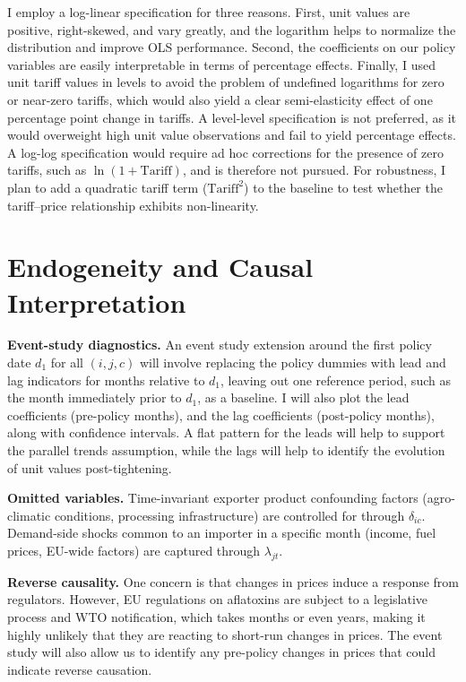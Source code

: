 \documentclass[12pt]{article}
\begin{document}
I employ a log-linear specification for three reasons. First, unit values are positive, right-skewed, and vary greatly, and the logarithm helps to normalize the distribution and improve OLS performance. Second, the coefficients on our policy variables are easily interpretable in terms of percentage effects. Finally, I used unit tariff values in levels to avoid the problem of undefined logarithms for zero or near-zero tariffs, which would also yield a clear semi-elasticity effect of one percentage point change in tariffs. A level-level specification is not preferred, as it would overweight high unit value observations and fail to yield percentage effects. A log-log specification would require ad hoc corrections for the presence of zero tariffs, such as $\ln(1 + \text{Tariff})$, and is therefore not pursued. For robustness, I plan to add a quadratic tariff term ($\text{Tariff}^2$) to the baseline to test whether the tariff--price relationship exhibits non-linearity.

\section{Endogeneity and Causal Interpretation}

\textbf{Event-study diagnostics.} An event study extension around the first policy date $d_1$ for all $(i, j, c)$ will involve replacing the policy dummies with lead and lag indicators for months relative to $d_1$, leaving out one reference period, such as the month immediately prior to $d_1$, as a baseline. I will also plot the lead coefficients (pre-policy months), and the lag coefficients (post-policy months), along with confidence intervals. A flat pattern for the leads will help to support the parallel trends assumption, while the lags will help to identify the evolution of unit values post-tightening.

\textbf{Omitted variables.} Time-invariant exporter product confounding factors (agro-climatic conditions, processing infrastructure) are controlled for through $\delta_{ic}$. Demand-side shocks common to an importer in a specific month (income, fuel prices, EU-wide factors) are captured through $\lambda_{jt}$.

\textbf{Reverse causality.} One concern is that changes in prices induce a response from regulators. However, EU regulations on aflatoxins are subject to a legislative process and WTO notification, which takes months or even years, making it highly unlikely that they are reacting to short-run changes in prices. The event study will also allow us to identify any pre-policy changes in prices that could indicate reverse causation.
\end{document}
